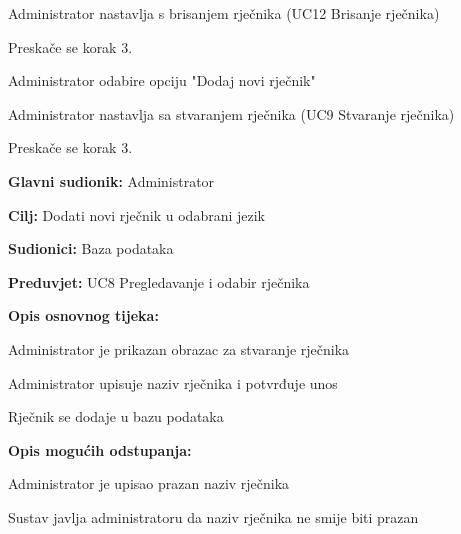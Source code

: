 \begin{packed_item}
\begin{packed_item}
\begin{packed_enum}
			\item Administrator nastavlja s brisanjem rječnika (UC12 Brisanje rječnika)
			\item Preskače se korak 3.
			
		\end{packed_enum}
		\item[2.b] Administrator odabire opciju "Dodaj novi rječnik"
		\item[] \begin{packed_enum}
			
			\item Administrator nastavlja sa stvaranjem rječnika (UC9 Stvaranje rječnika)
			\item Preskače se korak 3.
			
		\end{packed_enum}
		
	\end{packed_item}
	
\end{packed_item}

\noindent {}
\begin{packed_item}

	\item \textbf{Glavni sudionik: } Administrator
	\item \textbf{Cilj: } Dodati novi rječnik u odabrani jezik
	\item \textbf{Sudionici: } Baza podataka
	\item \textbf{Preduvjet: } UC8 Pregledavanje i odabir rječnika
	\item  \textbf{Opis osnovnog tijeka:}
	
	\item[] \begin{packed_enum}
		
		\item Administrator je prikazan obrazac za stvaranje rječnika
		\item Administrator upisuje naziv rječnika i potvrđuje unos
		\item Rječnik se dodaje u bazu podataka

	\end{packed_enum}

	\item  \textbf{Opis mogućih odstupanja:}
	
	\item[] \begin{packed_item}

		\item[2.a] Administrator je upisao prazan naziv rječnika
		\item[] \begin{packed_enum}
			
			\item Sustav javlja administratoru da naziv rječnika ne smije biti prazan
			
		\end{packed_enum}
		
	\end{packed_item}

\end{packed_item}


